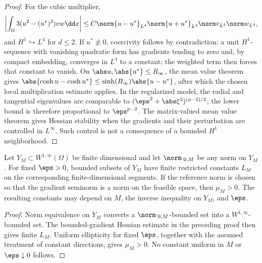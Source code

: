 \begin{proof}
For the cubic multiplier,
\[
 \left|\int_\Omega3(u^2-(u^*)^2)vw\dd x\right|
 \leq C\norm{u-u^*}_{L^4}\norm{u+u^*}_{L^4}
 \norm v_{L^4}\norm w_{L^4},
\]
and \(H^1\hookrightarrow L^4\) for \(d\leq2\). If \(u^*\not\equiv0\), coercivity follows by
contradiction: a unit \(H^1\)-sequence with vanishing quadratic form has gradients tending to zero and,
by compact embedding, converges in \(L^4\) to a constant; the weighted term then forces that constant
to vanish. On \(\abs u,\abs{u^*}\leq R_\infty\), the mean
value theorem gives
\(\abs{\cosh u-\cosh u^*}\leq\sinh(R_\infty)\abs{u-u^*}\), after which the chosen local
multiplication estimate applies. In the regularized model, the radial and tangential eigenvalues are
comparable to \((\eps^2+\abs\xi^2)^{(p-2)/2}\); the lower bound is therefore proportional to
\(\eps^{p-2}\). The matrix-valued mean value theorem gives Hessian stability when the gradients and
their perturbation are controlled in \(L^\infty\). Such control is not a consequence of a bounded
\(H^1\) neighborhood.
\end{proof}

\begin{proposition}
\label{prop:regularized-restricted}
Let \(Y_M\subset W^{1,\infty}(\Omega)\) be finite dimensional and let \(\norm\cdot_{0,M}\) be any norm
on \(Y_M\). For fixed \(\eps>0\), bounded subsets of \(Y_M\) have finite restricted constants
\(L_M\) on the corresponding finite-dimensional segments. If the reference norm is chosen so that the gradient seminorm is a
norm on the feasible space, then \(\mu_M>0\). The resulting constants may depend on \(M\), the inverse
inequality on \(Y_M\), and \(\eps\).
\end{proposition}

\begin{proof}
Norm equivalence on \(Y_M\) converts a \(\norm\cdot_{0,M}\)-bounded set into a
\(W^{1,\infty}\)-bounded set. The bounded-gradient Hessian estimate in the preceding proof then gives
finite \(L_M\). Uniform ellipticity for fixed \(\eps\), together with the assumed treatment of constant
directions, gives \(\mu_M>0\). No constant uniform in \(M\) or \(\eps\downarrow0\) follows.
\end{proof}

